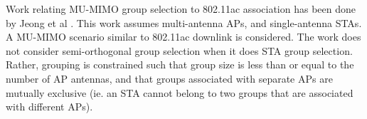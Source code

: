 Work relating MU-MIMO group selection to 802.11ac association has been done by Jeong et al \cite{7354607}. This work assumes multi-antenna APs, and single-antenna STAs. A MU-MIMO scenario similar to 802.11ac downlink is considered. The work does not consider semi-orthogonal group selection when it does STA group selection. Rather, grouping is constrained such that group size is less than or equal to the number of AP antennas, and that groups associated with separate APs are mutually exclusive (ie. an STA cannot belong to two groups that are associated with different APs).
